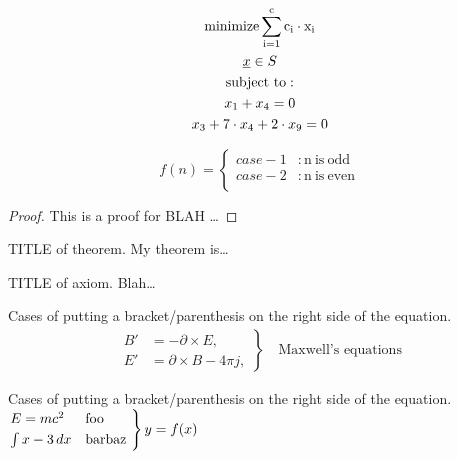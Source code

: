 \begin{gather*}
	{\rm minimize \displaystyle\sum^{c}_{i = 1} c_{i} \cdot x_{i}} \\	%
	\underline{x} \in S \\
	{\rm subject\ to:} \\
	x_{1} + x_{4} = 0 \\
	x_{3} + 7 \cdot x_{4} + 2\cdot x_{9} = 0
\end{gather*}


\begin{equation}
\label{eqn:caseenv}
f(n) = 
	\begin{cases}
	case-1 &: \mathrm{n\ is\ odd} \\
	case-2 &: \mathrm{n\ is\ even} \\
	\end{cases}
\end{equation}

\begin{proof}
This is a proof for BLAH \dots
\end{proof}




\begin{theorem}{TITLE of theorem.}
My theorem is\dots
\end{theorem}



\begin{axiom}{TITLE of axiom.}
Blah\dots
\end{axiom}



Cases of putting a bracket/parenthesis on the right side of the equation.
\begin{gather*}
	\left.\begin{aligned}
	B'&=-\partial \times E,\\
	E'&=\partial \times B - 4\pi j,
	\end{aligned}
	\right\}
	\quad\text{Maxwell's equations}
\end{gather*}


Cases of putting a bracket/parenthesis on the right side of the equation.\\
$\begin{rcases*}
	E = m c^2 & foo \\
	\int x-3\, dx & barbaz
\end{rcases*} y=f(x)$
\ \\
\ \\

